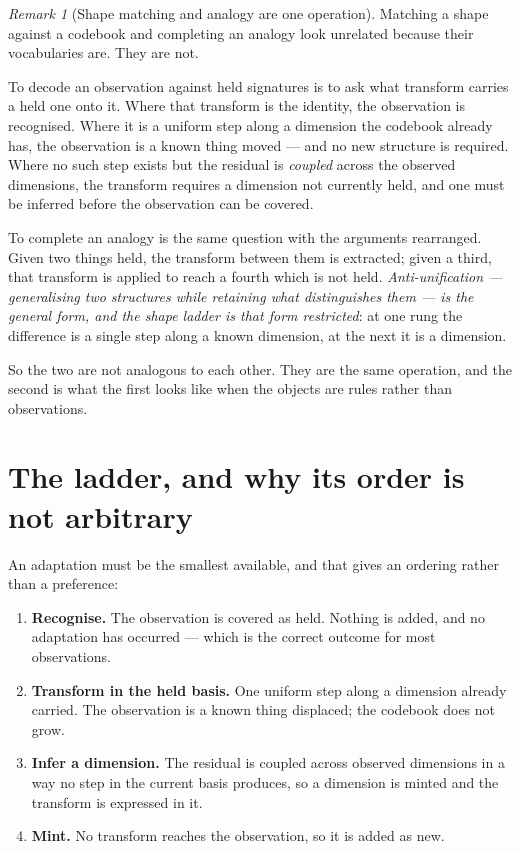 \documentclass[11pt,a4paper]{article}
\theoremstyle{remark}
\newtheorem{remark}[definition]{Remark}
\begin{document}
\begin{remark}[Shape matching and analogy are one operation]\label{rem:one}
Matching a shape against a codebook and completing an analogy look unrelated because their vocabularies
are. They are not.

To decode an observation against held signatures is to ask what transform carries a held one onto it.
Where that transform is the identity, the observation is recognised. Where it is a uniform step along a
dimension the codebook already has, the observation is a known thing moved --- and no new structure is
required. Where no such step exists but the residual is \emph{coupled} across the observed dimensions,
the transform requires a dimension not currently held, and one must be inferred before the observation
can be covered.

To complete an analogy is the same question with the arguments rearranged. Given two things held, the
transform between them is extracted; given a third, that transform is applied to reach a fourth which is
not held. \emph{Anti-unification --- generalising two structures while retaining what distinguishes
them --- is the general form, and the shape ladder is that form restricted}: at one rung the difference
is a single step along a known dimension, at the next it is a dimension.

So the two are not analogous to each other. They are the same operation, and the second is what the
first looks like when the objects are rules rather than observations.
\end{remark}

\section{The ladder, and why its order is not arbitrary}\label{sec:ladder}
An adaptation must be the smallest available, and that gives an ordering rather than a preference:

\begin{enumerate}[leftmargin=*]
\item \textbf{Recognise.} The observation is covered as held. Nothing is added, and no adaptation has
occurred --- which is the correct outcome for most observations.
\item \textbf{Transform in the held basis.} One uniform step along a dimension already carried. The
observation is a known thing displaced; the codebook does not grow.
\item \textbf{Infer a dimension.} The residual is coupled across observed dimensions in a way no step
in the current basis produces, so a dimension is minted and the transform is expressed in it.
\item \textbf{Mint.} No transform reaches the observation, so it is added as new.
\end{enumerate}
\end{document}
